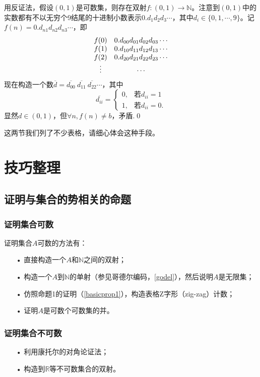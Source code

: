 \documentclass[b5paper,oneside]{ctexbook}
\begin{document}
用反证法，假设$(0,1)$是可数集，则存在双射$f:(0,1)\to\mathbb{N}$。注意到$(0,1)$中的实数都有不以无穷个9结尾的十进制小数表示$0.d_1d_2d_3\cdots$，其中$d_i\in\{0,1,\cdots ,9\}$。记$f(n)=0.d_{n1}d_{n2}d_{n3}\cdots$，即
\[\begin{array} {*{4}c} 
f(0) & 0.d_{00}d_{01}d_{02}d_{03}\cdots
\\f(1) & 0.d_{10}d_{11}d_{12}d_{13}\cdots
\\f(2) & 0.d_{20}d_{21}d_{22}d_{23}\cdots
\\\vdots & \cdots
\end{array}\]
现在构造一个数$\overline{d}=\overline{d_{00}}\ \overline{d_{11}}\ \overline{d_{22}}\cdots$，其中
\[\overline{d_{ii}}=\begin{cases}
0,&\text{若}d_{ii}=1
\\1,&\text{若}d_{ii}=0.\end{cases}\]
显然$d\in (0,1)$，但$\forall n,f(n)\neq b$，矛盾.\hfill\qed

这两节我们列了不少表格，请细心体会这种手段。
\section{技巧整理}
\subsection{证明与集合的势相关的命题}
\subsubsection{证明集合可数}
证明集合$A$可数的方法有：
\begin{enumerate}
\item[•]直接构造一个$A$和$\mathbb{N}$之间的双射；
\item[•]构造一个$A$到$\mathbb{N}$的单射（参见哥德尔编码，\ref{godel}），然后说明$A$是无限集；
\item[•]仿照命题1的证明（\ref{basicprop1}），构造表格Z字形（zig-zag）计数；
\item[•]证明$A$是可数个可数集的并。
\end{enumerate}
\subsubsection{证明集合不可数}
\begin{enumerate}
\item[•]利用康托尔的对角论证法；
\item[•]构造到$\mathbb{R}$等不可数集合的双射。
\end{enumerate}
\end{document}
